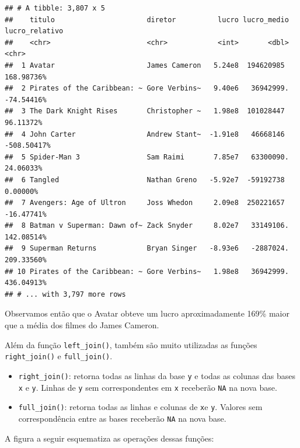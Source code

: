 \documentclass[
]{book}
\begin{document}
\begin{verbatim}
## # A tibble: 3,807 x 5
##    titulo                      diretor          lucro lucro_medio lucro_relativo
##    <chr>                       <chr>            <int>       <dbl> <chr>         
##  1 Avatar                      James Cameron   5.24e8  194620985  168.98736%    
##  2 Pirates of the Caribbean: ~ Gore Verbins~   9.40e6   36942999. -74.54416%    
##  3 The Dark Knight Rises       Christopher ~   1.98e8  101028447  96.11372%     
##  4 John Carter                 Andrew Stant~  -1.91e8   46668146  -508.50417%   
##  5 Spider-Man 3                Sam Raimi       7.85e7   63300090. 24.06033%     
##  6 Tangled                     Nathan Greno   -5.92e7  -59192738  0.00000%      
##  7 Avengers: Age of Ultron     Joss Whedon     2.09e8  250221657  -16.47741%    
##  8 Batman v Superman: Dawn of~ Zack Snyder     8.02e7   33149106. 142.08514%    
##  9 Superman Returns            Bryan Singer   -8.93e6   -2887024. 209.33560%    
## 10 Pirates of the Caribbean: ~ Gore Verbins~   1.98e8   36942999. 436.04913%    
## # ... with 3,797 more rows
\end{verbatim}

Observamos então que o Avatar obteve um lucro aproximadamente 169\% maior que a média dos filmes do James Cameron.

Além da função \texttt{left\_join()}, também são muito utilizadas as funções \texttt{right\_join()} e \texttt{full\_join()}.

\begin{itemize}
\item
  \texttt{right\_join()}: retorna todas as linhas da base \texttt{y} e todas as colunas das bases \texttt{x} e \texttt{y}. Linhas de \texttt{y} sem correspondentes em \texttt{x} receberão \texttt{NA} na nova base.
\item
  \texttt{full\_join()}: retorna todas as linhas e colunas de \texttt{x}e \texttt{y}. Valores sem correspondência entre as bases receberão \texttt{NA} na nova base.
\end{itemize}

A figura a seguir esquematiza as operações dessas funções:
\end{document}
